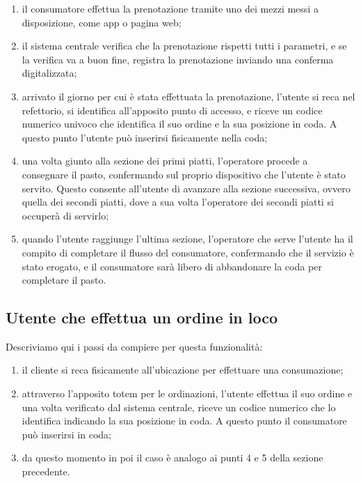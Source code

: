 \documentclass[a4paper, titlepage, 12pt, openright, oneside]{book}
\begin{document}
\begin{enumerate}
	\item il consumatore effettua la prenotazione tramite uno dei mezzi messi a disposizione, come app o pagina web;
	\item il sistema centrale verifica che la prenotazione rispetti tutti i parametri, e se la verifica va a buon fine, registra la prenotazione
		  inviando una conferma digitalizzata;
	\item arrivato il giorno per cui è stata effettuata la prenotazione, l'utente si reca nel refettorio, si identifica all'apposito punto di accesso,
		  e riceve un codice numerico univoco che identifica il suo ordine e la sua posizione in coda. A questo punto l'utente può inserirsi fisicamente nella coda;
	\item una volta giunto alla sezione dei primi piatti, l'operatore procede a consegnare il pasto, confermando sul proprio dispositivo che l'utente è stato servito.
		  Questo consente all'utente di avanzare alla sezione successiva, ovvero quella dei secondi piatti, dove a sua volta l'operatore dei secondi piatti si occuperà di servirlo;
	\item quando l'utente raggiunge l'ultima sezione, l'operatore che serve l'utente ha il compito di completare il flusso del consumatore, confermando che il servizio è stato erogato, e il consumatore sarà libero di abbandonare la coda per completare il pasto.
\end{enumerate}

\subsection{Utente che effettua un ordine in loco}

Descriviamo qui i passi da compiere per questa funzionalità:

\begin{enumerate}
	\item il cliente si reca fisicamente all'ubicazione per effettuare una consumazione;
	\item attraverso l'apposito totem per le ordinazioni, l'utente effettua il suo ordine e una volta verificato dal sistema centrale, riceve un codice numerico che lo identifica indicando la sua posizione in coda. A questo punto il consumatore può inserirsi in coda;
	\item da questo momento in poi il caso è analogo ai punti 4 e 5 della sezione precedente.
\end{enumerate}
\end{document}
